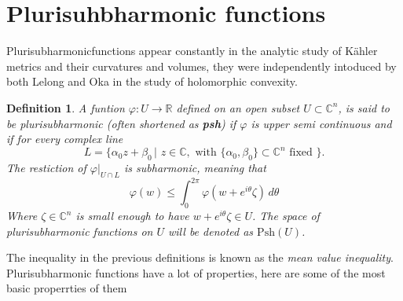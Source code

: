 \documentclass[12pt,twoside,a4paper]{report}
\newtheorem{definition}{Definition}[section]
\newcommand{\re}{\ensuremath{\mathbb R }}
\newcommand{\co}{\ensuremath{\mathbb C }}
\newcommand{\con}{\ensuremath{\mathbb{C}^n}}
\newcommand{\psh}{\ensuremath{\mathrm{Psh}}}
\begin{document}
  \section{Plurisuhbharmonic functions}
  \noindent Plurisubharmonicfunctions appear constantly in the analytic study of Kähler metrics and their curvatures and volumes, they were independently intoduced by both Lelong and Oka in the study of holomorphic convexity.
  \begin{definition}\label{psh}
    A funtion \(\varphi:U\to\re\) defined on an open subset \(U\subset\con\), is said to be plurisubharmonic (often shortened as \textbf{psh}) if \(\varphi\) is upper semi continuous and if for every complex line
    \[
      L=\{\alpha_0 z+\beta_0\,|\,\,z\in\co,\text{ with }\{\alpha_0,\beta_0\}\subset\con\text{ fixed }\}.
    \]
    The restiction of \(\varphi|_{U\cap L}\) is subharmonic, meaning that
    \begin{equation}
      \varphi(w)\leq\int_0^{2\pi}\varphi(w+e^{i\theta}\zeta)\,d\theta
    \end{equation}
    Where \(\zeta\in\con\) is small enough to have \(w+e^{i\theta}\zeta\in U\). The space of plurisubharmonic functions on \(U\) will be denoted as \(\psh(U)\).
  \end{definition}
  The inequality in the previous definitions is known as the \emph{mean value inequality}. Plurisubharmonic functions have a lot of properties, here are some of the most basic properrties of them
\end{document}
